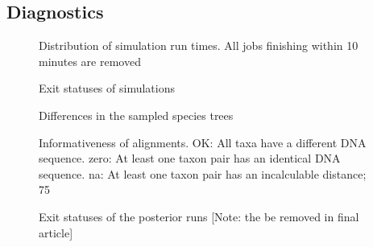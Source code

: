 \subsection{Diagnostics}

\begin{figure}
  \caption{
    Distribution of simulation run times. All jobs finishing within 10 minutes are removed
  }
  \label{fig:run_times}
\end{figure}

\begin{figure}
  \caption{
    Exit statuses of simulations
  }
  \label{fig:exit_statuses}
\end{figure}

\begin{figure}
  \caption{
    Differences in the sampled species trees
  }
  \label{fig:strees_different}
\end{figure}

\begin{figure}
  \caption{
    Informativeness of alignments. 
    OK: All taxa have a different DNA sequence.
    zero: At least one taxon pair has an identical DNA sequence.
    na: At least one taxon pair has an incalculable distance; 75%
  }
  \label{fig:alignment_qualities}
\end{figure}

\begin{figure}
  \caption{
    Exit statuses of the posterior runs [Note: the be removed in final article]
  }
  \label{fig:exit_statuses_posteriors}
\end{figure}

